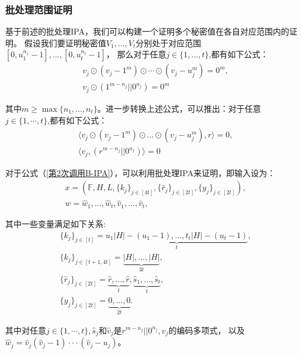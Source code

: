 \documentclass[zihao=-4]{ctexart}
\begin{document}
\subsubsection{批处理范围证明}
基于前述的批处理IPA，我们可以构建一个证明多个秘密值在各自对应范围内的证明。
假设我们要证明秘密值$V_1,...,V_t$分别处于对应范围$[0,u_1^{n_1}-1],...,[0,u_t^{n_t}-1]$，
那么对于任意$j \in \{1,\ldots,t\}$,都有如下公式：
\begin{equation}\begin{aligned}&v_j\odot(v_j-1^m)\odot\cdots\odot(v_j-u_j^m)=0^m,\\&v_j\odot(1^{m-n_j}||0^{n_j})=0^m\end{aligned}\end{equation}\par
其中$m\ge\max\{n_1,...,n_t\}$。进一步转换上述公式，可以推出：对于任意$j \in \{1,\cdots,t\}$,都有如下公式：
\begin{equation}\begin{aligned}
&\langle v_j\odot(v_j-1^m)\odot...\odot(v_j-u_j^m),r\rangle=0,\\
&\langle v_j,(r^{m-n_j}||0^{n_j})\rangle=0\label{第2次调用B-IPA}
\end{aligned}\end{equation}\par
对于公式（\ref{第2次调用B-IPA}），可以利用批处理IPA来证明，即输入设为：
\begin{equation}\begin{aligned}
&x=(\mathbb{F},H,L,\{k_j\}_{j \in [4t]},\{\hat{r}_j\}_{j\in [2t]},\{y_j\}_{j \in [2t]}),\\
&w=\hat{w}_1,...,\hat{w}_t,\hat{v}_1,...,\hat{v}_t,
\end{aligned}\end{equation}\par
其中一些变量满足如下关系:
\begin{equation}\begin{aligned}
&\{k_j\}_{j\in [t]}=\underbrace{u_1|H|-(u_1-1),...,t_t|H|-(u_t-1)}_t,\\
&\{k_j\}_{j\in [t+1,4t]}=\underbrace{|H|,...,|H|}_{3t},\\
&\{\hat{r}_j\}_{j\in [2t]}=\underbrace{\hat{r},...,\hat{r}}_t,\underbrace{\hat{s}_1,...,\hat{s}_t}_t,\\
&\{y_j\}_{j\in [2t]}=\underbrace{0,...,0}_{2t}.
\end{aligned}\end{equation}\par
其中对任意$j\in \{1,\cdots,t\},\hat{s}_j$和$\hat{v}_j$是$r^{m-n_j}||0^{n_j},v_j$的编码多项式，
以及$\hat{w}_j=\hat{v}_j(\hat{v}_j-1)\cdot\cdot\cdot(\hat{v}_j-u_j)$。\par
\end{document}

